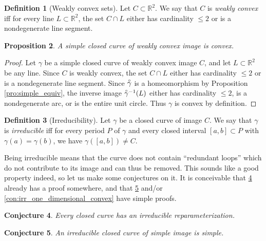 \documentclass{amsart}
\newtheorem{proposition}{Proposition}[section]
\newtheorem{conjecture}[proposition]{Conjecture}
\theoremstyle{definition}
\newtheorem{definition}[proposition]{Definition}
\theoremstyle{remark}
\newcommand{\lring}[1]{\accentset{\circ}{#1}}
\begin{document}
\begin{definition}[Weakly convex sets]
    Let $C\subset\mathbb{R}^2$. We say that $C$ is \emph{weakly convex}
    iff for every line $L\subset\mathbb{R}^2$, the set $C\cap L$
    either has cardinality $\le2$ or is a nondegenerate line segment.
\end{definition}

\begin{proposition}
    \label{pro:simple_convex}
    A simple closed curve of weakly convex image is convex.
\end{proposition}

\begin{proof}
    Let $\gamma$ be a simple closed curve of weakly convex image $C$,
    and let $L\subset\mathbb{R}^2$ be any line.
    Since $C$ is weakly convex, the set $C\cap L$
    either has cardinality $\le2$ or is a nondegenerate line segment.
    Since $\lring{\gamma}$ is a homeomorphism by Proposition
    \ref{pro:simple_equiv}, the inverse image $\lring{\gamma}^{-1}(L)$
    either has cardinality $\le2$, is a nondegenerate arc, or is
    the entire unit circle. Thus $\gamma$ is convex by definition.
\end{proof}

\begin{definition}[Irreducibility]
    Let $\gamma$ be a closed curve of image $C$.
    We say that $\gamma$ is \emph{irreducible} iff for every period
    $P$ of $\gamma$ and every closed interval $[a,b]\subset P$
    with $\gamma(a)=\gamma(b)$, we have
    $\gamma([a,b])\ne C$.
\end{definition}

Being irreducible means that the curve does not contain
``redundant loops'' which do not contribute to its image
and can thus be removed.
This sounds like a good property indeed,
so let us make some conjectures on it.
It is conceivable that
\ref{con:irr_exists} already has a proof somewhere,
and that \ref{con:irr_simple} and/or
\ref{con:irr_one_dimensional_convex} have simple proofs.

\begin{conjecture}
    \label{con:irr_exists}
    Every closed curve has an irreducible reparameterization.
\end{conjecture}

\begin{conjecture}
    \label{con:irr_simple}
    An irreducible closed curve of simple image is simple.
\end{conjecture}
\end{document}
